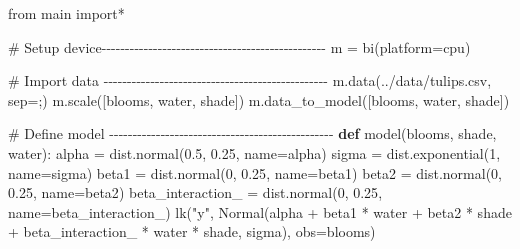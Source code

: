 \documentclass[
  letterpaper,
  DIV=11,
  numbers=noendperiod]{scrreprt}
\newenvironment{Shaded}{\begin{snugshade}}{\end{snugshade}}
\newcommand{\CommentTok}[1]{\textcolor[rgb]{0.37,0.37,0.37}{#1}}
\newcommand{\DecValTok}[1]{\textcolor[rgb]{0.68,0.00,0.00}{#1}}
\newcommand{\FloatTok}[1]{\textcolor[rgb]{0.68,0.00,0.00}{#1}}
\newcommand{\ImportTok}[1]{\textcolor[rgb]{0.00,0.46,0.62}{#1}}
\newcommand{\KeywordTok}[1]{\textcolor[rgb]{0.00,0.23,0.31}{\textbf{#1}}}
\newcommand{\NormalTok}[1]{\textcolor[rgb]{0.00,0.23,0.31}{#1}}
\newcommand{\OperatorTok}[1]{\textcolor[rgb]{0.37,0.37,0.37}{#1}}
\newcommand{\StringTok}[1]{\textcolor[rgb]{0.13,0.47,0.30}{#1}}
\begin{document}
\begin{Shaded}
\begin{Highlighting}[]
\ImportTok{from}\NormalTok{ main }\ImportTok{import}\OperatorTok{*}

\CommentTok{\# Setup device{-}{-}{-}{-}{-}{-}{-}{-}{-}{-}{-}{-}{-}{-}{-}{-}{-}{-}{-}{-}{-}{-}{-}{-}{-}{-}{-}{-}{-}{-}{-}{-}{-}{-}{-}{-}{-}{-}{-}{-}{-}{-}{-}{-}{-}{-}{-}{-}}
\NormalTok{m }\OperatorTok{=}\NormalTok{ bi(platform}\OperatorTok{=}\StringTok{\textquotesingle{}cpu\textquotesingle{}}\NormalTok{)}

\CommentTok{\# Import data {-}{-}{-}{-}{-}{-}{-}{-}{-}{-}{-}{-}{-}{-}{-}{-}{-}{-}{-}{-}{-}{-}{-}{-}{-}{-}{-}{-}{-}{-}{-}{-}{-}{-}{-}{-}{-}{-}{-}{-}{-}{-}{-}{-}{-}{-}{-}{-}}
\NormalTok{m.data(}\StringTok{\textquotesingle{}../data/tulips.csv\textquotesingle{}}\NormalTok{, sep}\OperatorTok{=}\StringTok{\textquotesingle{};\textquotesingle{}}\NormalTok{) }
\NormalTok{m.scale([}\StringTok{\textquotesingle{}blooms\textquotesingle{}}\NormalTok{, }\StringTok{\textquotesingle{}water\textquotesingle{}}\NormalTok{, }\StringTok{\textquotesingle{}shade\textquotesingle{}}\NormalTok{])}
\NormalTok{m.data\_to\_model([}\StringTok{\textquotesingle{}blooms\textquotesingle{}}\NormalTok{, }\StringTok{\textquotesingle{}water\textquotesingle{}}\NormalTok{, }\StringTok{\textquotesingle{}shade\textquotesingle{}}\NormalTok{])}

\CommentTok{\# Define model {-}{-}{-}{-}{-}{-}{-}{-}{-}{-}{-}{-}{-}{-}{-}{-}{-}{-}{-}{-}{-}{-}{-}{-}{-}{-}{-}{-}{-}{-}{-}{-}{-}{-}{-}{-}{-}{-}{-}{-}{-}{-}{-}{-}{-}{-}{-}{-}}
\KeywordTok{def}\NormalTok{ model(blooms, shade, water):}
\NormalTok{    alpha }\OperatorTok{=}\NormalTok{ dist.normal(}\FloatTok{0.5}\NormalTok{, }\FloatTok{0.25}\NormalTok{, name}\OperatorTok{=}\StringTok{\textquotesingle{}alpha\textquotesingle{}}\NormalTok{)}
\NormalTok{    sigma }\OperatorTok{=}\NormalTok{ dist.exponential(}\DecValTok{1}\NormalTok{, name}\OperatorTok{=}\StringTok{\textquotesingle{}sigma\textquotesingle{}}\NormalTok{)}
\NormalTok{    beta1 }\OperatorTok{=}\NormalTok{ dist.normal(}\DecValTok{0}\NormalTok{, }\FloatTok{0.25}\NormalTok{, name}\OperatorTok{=}\StringTok{\textquotesingle{}beta1\textquotesingle{}}\NormalTok{)}
\NormalTok{    beta2 }\OperatorTok{=}\NormalTok{ dist.normal(}\DecValTok{0}\NormalTok{, }\FloatTok{0.25}\NormalTok{, name}\OperatorTok{=}\StringTok{\textquotesingle{}beta2\textquotesingle{}}\NormalTok{)}
\NormalTok{    beta\_interaction\_ }\OperatorTok{=}\NormalTok{ dist.normal(}\DecValTok{0}\NormalTok{, }\FloatTok{0.25}\NormalTok{, name}\OperatorTok{=}\StringTok{\textquotesingle{}beta\_interaction\_\textquotesingle{}}\NormalTok{)    }
\NormalTok{    lk(}\StringTok{"y"}\NormalTok{, Normal(alpha }\OperatorTok{+}\NormalTok{ beta1 }\OperatorTok{*}\NormalTok{ water }\OperatorTok{+}\NormalTok{ beta2 }\OperatorTok{*}\NormalTok{ shade }\OperatorTok{+}\NormalTok{ beta\_interaction\_ }\OperatorTok{*}\NormalTok{ water }\OperatorTok{*}\NormalTok{ shade, sigma), obs}\OperatorTok{=}\NormalTok{blooms)}


\end{Highlighting}
\end{Shaded}
\end{document}
